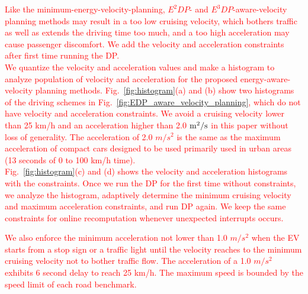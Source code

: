 \documentclass{IEEEtran}
\begin{document}
\textcolor{red}{Like the minimum-energy-velocity-planning, $E^2DP$- and $E^3DP$-aware-velocity planning methods may result in a too low cruising velocity, which bothers traffic as well as extends the driving time too much, and a too high acceleration may cause passenger discomfort. We add the velocity and acceleration constraints after first time running the DP. \\
We quantize the velocity and acceleration values and make a histogram to analyze population of velocity and acceleration for the proposed energy-aware-velocity planning methods. Fig.~\ref{fig:histogram}(a) and (b) show two histograms of the driving schemes in Fig.~\ref{fig:EDP_aware_velocity_planning}, which do not have velocity and acceleration constraints. We avoid a cruising velocity lower than 25 km/h and an acceleration higher than 2.0 $\rm{m^2}/s$ in this paper without loss of generality. The  acceleration of 2.0 $m/s^2$ is the same as the maximum acceleration of compact cars designed to be used primarily used in urban areas (13 seconds of 0 to 100 km/h time).\\
Fig.~\ref{fig:histogram}(c) and (d) shows the velocity and acceleration histograms with the constraints. Once we run the DP for the first time without constraints, we analyze the histogram, adaptively determine the minimum cruising velocity and maximum acceleration constraints, and run DP again. We keep the same constraints for online recomputation whenever unexpected interrupts occurs.} 

\textcolor{red}{We also enforce the minimum acceleration not lower than 1.0 $m/s^2$ when the EV starts from a stop sign or a traffic light until the velocity reaches to the minimum cruising velocity not to bother traffic flow. The acceleration of a 1.0 $m/s^2$ exhibits 6 second delay to reach 25 km/h. The maximum speed is bounded by the speed limit of each road benchmark.}
%
\end{document}
